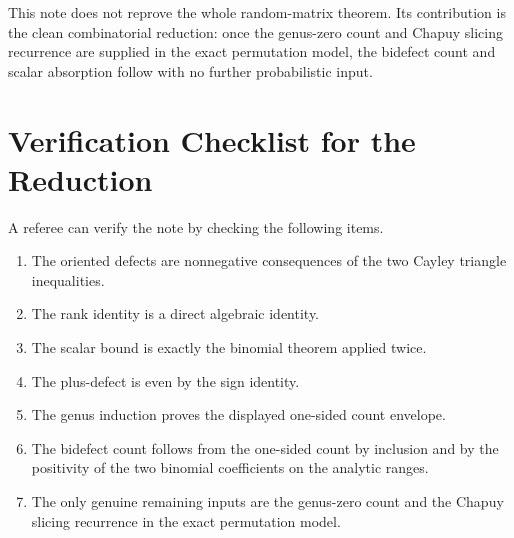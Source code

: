 \documentclass[11pt]{article}
\numberwithin{equation}{section}
\begin{document}
This note does not reprove the whole random-matrix theorem.  Its contribution
is the clean combinatorial reduction: once the genus-zero count and Chapuy
slicing recurrence are supplied in the exact permutation model, the bidefect
count and scalar absorption follow with no further probabilistic input.

\section*{Verification Checklist for the Reduction}

A referee can verify the note by checking the following items.

\begin{enumerate}[leftmargin=2.3em]
  \item The oriented defects are nonnegative consequences of the two Cayley
  triangle inequalities.
  \item The rank identity is a direct algebraic identity.
  \item The scalar bound is exactly the binomial theorem applied twice.
  \item The plus-defect is even by the sign identity.
  \item The genus induction proves the displayed one-sided count envelope.
  \item The bidefect count follows from the one-sided count by inclusion and
  by the positivity of the two binomial coefficients on the analytic ranges.
  \item The only genuine remaining inputs are the genus-zero count and the
  Chapuy slicing recurrence in the exact permutation model.
\end{enumerate}
\end{document}
